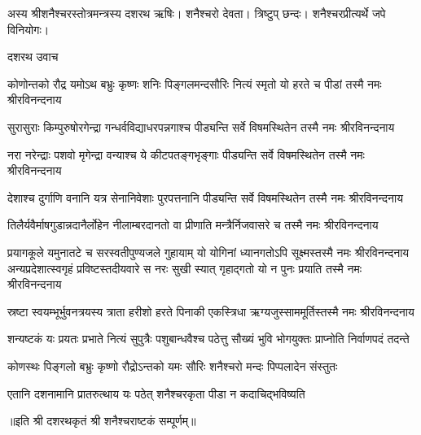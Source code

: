 

अस्य श्रीशनैश्चरस्तोत्रमन्त्रस्य दशरथ ऋषिः। शनैश्चरो देवता। त्रिष्टुप् छन्दः। शनैश्चरप्रीत्यर्थे जपे विनियोगः।

दशरथ उवाच

\twolineshloka
{कोणोन्तको रौद्र यमोऽथ बभ्रुः कृष्णः शनिः पिङ्गलमन्दसौरिः}
{नित्यं स्मृतो यो हरते च पीडां तस्मै नमः श्रीरविनन्दनाय}

\twolineshloka
{सुरासुराः किम्पुरुषोरगेन्द्रा गन्धर्वविद्याधरपन्नगाश्च}
{पीड्यन्ति सर्वे विषमस्थितेन तस्मै नमः श्रीरविनन्दनाय}

\twolineshloka
{नरा नरेन्द्राः पशवो मृगेन्द्रा वन्याश्च ये कीटपतङ्गभृङ्गाः}
{पीड्यन्ति सर्वे विषमस्थितेन तस्मै नमः श्रीरविनन्दनाय}

\twolineshloka
{देशाश्च दुर्गाणि वनानि यत्र सेनानिवेशाः पुरपत्तनानि}
{पीड्यन्ति सर्वे विषमस्थितेन तस्मै नमः श्रीरविनन्दनाय}

\twolineshloka
{तिलैर्यवैर्माषगुडान्नदानैर्लोहेन नीलाम्बरदानतो वा}
{प्रीणाति मन्त्रैर्निजवासरे च तस्मै नमः श्रीरविनन्दनाय}

\twolineshloka
{प्रयागकूले यमुनातटे च सरस्वतीपुण्यजले गुहायाम्}
{यो योगिनां ध्यानगतोऽपि सूक्ष्मस्तस्मै नमः श्रीरविनन्दनाय}
\twolineshloka
{अन्यप्रदेशात्स्वगृहं प्रविष्टस्तदीयवारे स नरः सुखी स्यात्}
{गृहाद्गतो यो न पुनः प्रयाति तस्मै नमः श्रीरविनन्दनाय}

\twolineshloka
{स्रष्टा स्वयम्भूर्भुवनत्रयस्य त्राता हरीशो हरते पिनाकी}
{एकस्त्रिधा ऋग्यजुस्साममूर्तिस्तस्मै नमः श्रीरविनन्दनाय}

\twolineshloka
{शन्यष्टकं यः प्रयतः प्रभाते नित्यं सुपुत्रैः पशुबान्धवैश्च}
{पठेत्तु सौख्यं भुवि भोगयुक्तः प्राप्नोति निर्वाणपदं तदन्ते}

\twolineshloka
{कोणस्थः पिङ्गलो बभ्रुः कृष्णो रौद्रोऽन्तको यमः}
{सौरिः शनैश्चरो मन्दः पिप्पलादेन संस्तुतः}

\twolineshloka
{एतानि दशनामानि प्रातरुत्थाय यः पठेत्}
{शनैश्चरकृता पीडा न कदाचिद्भविष्यति}

॥इति श्री दशरथकृतं श्री शनैश्चराष्टकं सम्पूर्णम्॥

